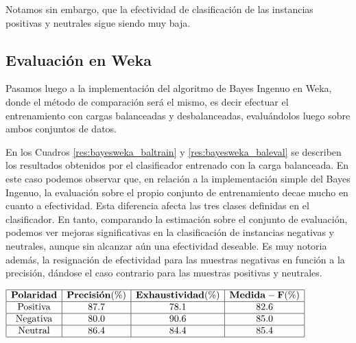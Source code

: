 Notamos sin embargo, que la efectividad de clasificaci\'on de las instancias positivas y neutrales sigue siendo muy baja.


\subsection{Evaluaci\'on en Weka}

Pasamos luego a la implementaci\'on del algoritmo de Bayes Ingenuo en Weka, donde el m\'etodo de comparaci\'on ser\'a el mismo, es decir efectuar el entrenamiento con cargas balanceadas y desbalanceadas, evalu\'andolos luego sobre ambos conjuntos de datos.
\newline

En los Cuadros \ref{res:bayesweka_baltrain} y \ref{res:bayesweka_baleval} se describen los resultados obtenidos por el clasificador entrenado con la carga balanceada. En este caso podemos observar que, en relaci\'on a la implementaci\'on simple del Bayes Ingenuo, la evaluaci\'on sobre el propio conjunto de entrenamiento decae mucho en cuanto a efectividad. Esta diferencia afecta las tres clases definidas en el clasificador. En tanto, comparando la estimaci\'on sobre el conjunto de evaluaci\'on, podemos ver mejoras significativas en la clasificaci\'on de instancias negativas y neutrales, aunque sin alcanzar a\'un una efectividad deseable. Es muy notoria adem\'as, la resignaci\'on de efectividad para las muestras negativas en funci\'on a la precisi\'on, d\'andose el caso contrario para las muestras positivas y neutrales.


\begin{table}[htb] 
\centering

$
\begin{array}{|c|c|c|c|}
      \hline
      \mathbf{Polaridad} & \mathbf{Precisi\acute{o}n(\%)} & \mathbf{Exhaustividad(\%)} & \mathbf{Medida-F(\%)}	\\
      \hline
      \mathrm{Positiva}  & 87.7	& 78.1 & 82.6	\\
      \hline
      \mathrm{Negativa}  & 80.0 & 90.6 & 85.0	\\
      \hline
      \mathrm{Neutral}	 & 86.4 & 84.4 & 85.4	\\
      \hline
\end{array}
$
\caption{Evaluaci\'on de Bayes Ingenuo en Weka entrenado con carga balanceada sobre el conjunto de entrenamiento.}
\label{res:bayesweka_baltrain}
\end{table}

